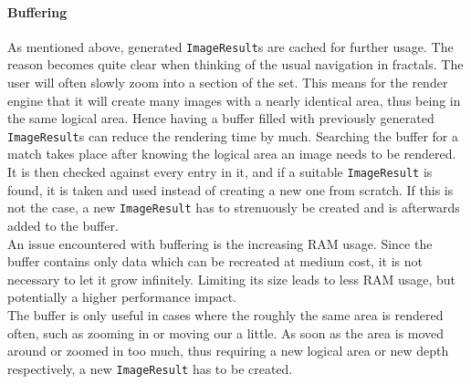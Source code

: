 \documentclass[10pt,a4paper,titlepage]{article}
\begin{document}
	\paragraph{Buffering} \label{par:paragraph_image_creation_buffering}
	As mentioned above, generated \verb|ImageResult|s are cached for further usage. The reason becomes quite clear when thinking of the usual navigation in fractals. The user will often slowly zoom into a section of the set. This means for the render engine that it will create many images with a nearly identical area, thus being in the same logical area. Hence having a buffer filled with previously generated \verb|ImageResult|s can reduce the rendering time by much. Searching the buffer for a match takes place after knowing the logical area an image needs to be rendered. It is then checked against every entry in it, and if a suitable \verb|ImageResult| is found, it is taken and used instead of creating a new one from scratch. If this is not the case, a new \verb|ImageResult| has to strenuously be created and is afterwards added to the buffer.\\
	An issue encountered with buffering is the increasing RAM usage. Since the buffer contains only data which can be recreated at medium cost, it is not necessary to let it grow infinitely. Limiting its size leads to less RAM usage, but potentially a higher performance impact.\\ The buffer is only useful in cases where the roughly the same area is rendered often, such as zooming in or moving our a little. As soon as the area is moved around or zoomed in too much, thus requiring a new logical area or new depth respectively, a new \verb|ImageResult| has to be created.

	\fi
\end{document}
